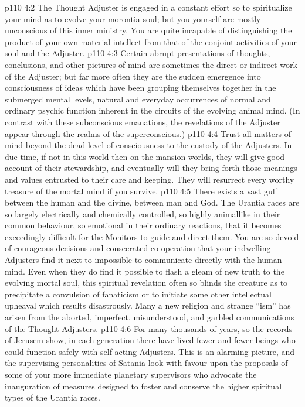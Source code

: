 \vs p110 4:2 The Thought Adjuster is engaged in a constant effort so to spiritualize your mind as to evolve your morontia soul; but you yourself are mostly unconscious of this inner ministry. You are quite incapable of distinguishing the product of your own material intellect from that of the conjoint activities of your soul and the Adjuster.
\vs p110 4:3 Certain abrupt presentations of thoughts, conclusions, and other pictures of mind are sometimes the direct or indirect work of the Adjuster; but far more often they are the sudden emergence into consciousness of ideas which have been grouping themselves together in the submerged mental levels, natural and everyday occurrences of normal and ordinary psychic function inherent in the circuits of the evolving animal mind. (In contrast with these subconscious emanations, the revelations of the Adjuster appear through the realms of the superconscious.)
\vs p110 4:4 Trust all matters of mind beyond the dead level of consciousness to the custody of the Adjusters. In due time, if not in this world then on the mansion worlds, they will give good account of their stewardship, and eventually will they bring forth those meanings and values entrusted to their care and keeping. They will resurrect every worthy treasure of the mortal mind if you survive.
\vs p110 4:5 \pc There exists a vast gulf between the human and the divine, between man and God. The Urantia races are so largely electrically and chemically controlled, so highly animallike in their common behaviour, so emotional in their ordinary reactions, that it becomes exceedingly difficult for the Monitors to guide and direct them. You are so devoid of courageous decisions and consecrated co\hyp{}operation that your indwelling Adjusters find it next to impossible to communicate directly with the human mind. Even when they do find it possible to flash a gleam of new truth to the evolving mortal soul, this spiritual revelation often so blinds the creature as to precipitate a convulsion of fanaticism or to initiate some other intellectual upheaval which results disastrously. Many a new religion and strange “ism” has arisen from the aborted, imperfect, misunderstood, and garbled communications of the Thought Adjusters.
\vs p110 4:6 For many thousands of years, so the records of Jerusem show, in each generation there have lived fewer and fewer beings who could function safely with self\hyp{}acting Adjusters. This is an alarming picture, and the supervising personalities of Satania look with favour upon the proposals of some of your more immediate planetary supervisors who advocate the inauguration of measures designed to foster and conserve the higher spiritual types of the Urantia races.

